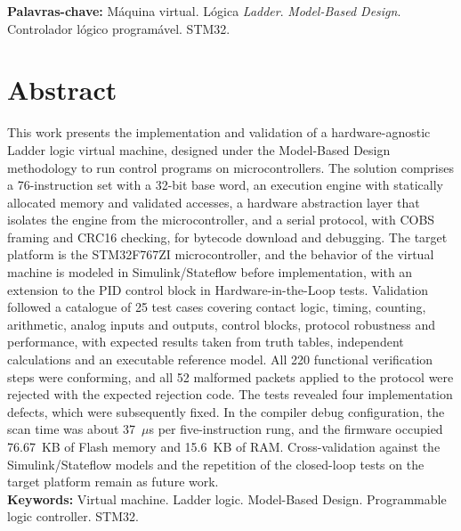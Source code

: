 \documentclass[portuguese,12pt,oneside,a4paper]{book}
\begin{document}
\noindent \textbf{Palavras-chave:} Máquina virtual. Lógica \textit{Ladder}. \textit{Model-Based Design}. Controlador lógico programável. STM32.


\pagebreak



 \chapter*{Abstract}
This work presents the implementation and validation of a hardware-agnostic Ladder logic virtual machine, designed under the Model-Based Design methodology to run control programs on microcontrollers. The solution comprises a 76-instruction set with a 32-bit base word, an execution engine with statically allocated memory and validated accesses, a hardware abstraction layer that isolates the engine from the microcontroller, and a serial protocol, with COBS framing and CRC16 checking, for bytecode download and debugging. The target platform is the STM32F767ZI microcontroller, and the behavior of the virtual machine is modeled in Simulink/Stateflow before implementation, with an extension to the PID control block in Hardware-in-the-Loop tests. Validation followed a catalogue of 25 test cases covering contact logic, timing, counting, arithmetic, analog inputs and outputs, control blocks, protocol robustness and performance, with expected results taken from truth tables, independent calculations and an executable reference model. All 220 functional verification steps were conforming, and all 52 malformed packets applied to the protocol were rejected with the expected rejection code. The tests revealed four implementation defects, which were subsequently fixed. In the compiler debug configuration, the scan time was about 37~$\mu$s per five-instruction rung, and the firmware occupied 76.67~KB of Flash memory and 15.6~KB of RAM. Cross-validation against the Simulink/Stateflow models and the repetition of the closed-loop tests on the target platform remain as future work.\\

 \noindent \textbf{Keywords:} Virtual machine. Ladder logic. Model-Based Design. Programmable logic controller. STM32.



\listoffigures
\listofquadros
\listoftables
\end{document}
